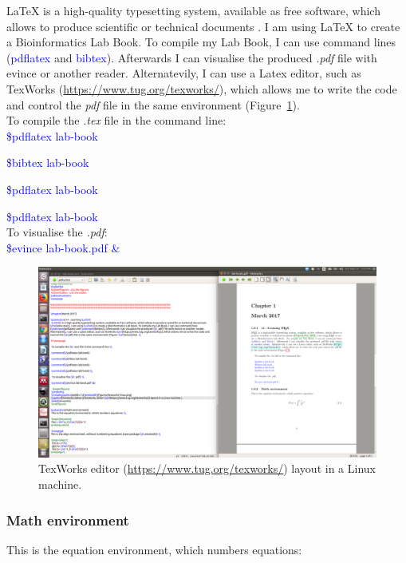 \documentclass[12pt,a4paper]{report}
\newcommand{\command}[1]{\textcolor{blue}{#1}}
\begin{document}
  \LaTeX{} is a high-quality typesetting system, available as free software, which allows to produce scientific or technical documents \cite{latex-main}. I am using \LaTeX{} to create a Bioinformatics Lab Book. To compile my Lab Book, I can use command lines (\command{pdflatex} and \command{bibtex}). Afterwards I can visualise the produced {\it .pdf} file with evince or another reader. Alternatevily, I can use a Latex editor, such as TexWorks (\url{https://www.tug.org/texworks/}), which allows me to write the code and control the {\it pdf} file in the same environment (Figure~\ref{texworks}).  \\
  
  
  To compile the {\it .tex} file in the command line: \\
  
  \command{\$pdflatex lab-book}
  
  \command{\$bibtex lab-book}
  
  \command{\$pdflatex lab-book}
    
  \command{\$pdflatex lab-book} \\
  
   To visualise the {\it .pdf}: \\
  
  \command{\$evince lab-book.pdf \&}
  
    \begin{figure}
  \centering 
  \includegraphics[width=1.0\textwidth]{figures/texworks-linux.png} 
  \caption[TexWorks Editor.]{TexWorks editor (\url{https://www.tug.org/texworks/}) layout in a Linux machine.}
  \label{texworks} 
  \end{figure}
  
 \subsubsection{Math environment}
  This is the equation environment, which numbers equations: \\
  
\end{document}
